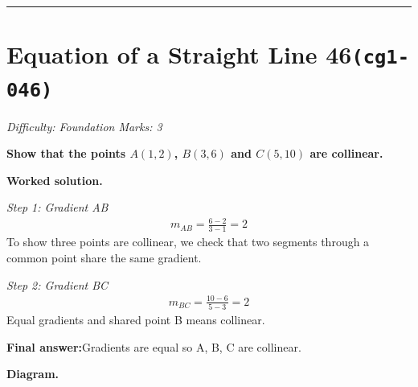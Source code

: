\documentclass[11pt]{article}
\newcommand{\question}[1]{\par\medskip\noindent\textbf{#1}\par}
\begin{document}
\medskip\hrule

\section*{Equation of a Straight Line 46\quad\small\texttt{(cg1-046)}}
\textit{Difficulty: Foundation \quad\textbar\quad Marks: 3}

\question{Show that the points \( A(1, 2) \), \( B(3, 6) \) and \( C(5, 10) \) are collinear.}

\textbf{Worked solution.}

\textit{Step 1: Gradient AB}
\[\begin{gathered}
m_{AB} = \frac{6-2}{3-1} = 2
\end{gathered}\]
To show three points are collinear, we check that two segments through a common point share the same gradient.

\textit{Step 2: Gradient BC}
\[\begin{gathered}
m_{BC} = \frac{10-6}{5-3} = 2
\end{gathered}\]
Equal gradients and shared point B means collinear.

\begin{answerbox}
\textbf{Final answer:}\quad Gradients are equal so A, B, C are collinear.
\end{answerbox}
\textbf{Diagram.}
\end{document}
